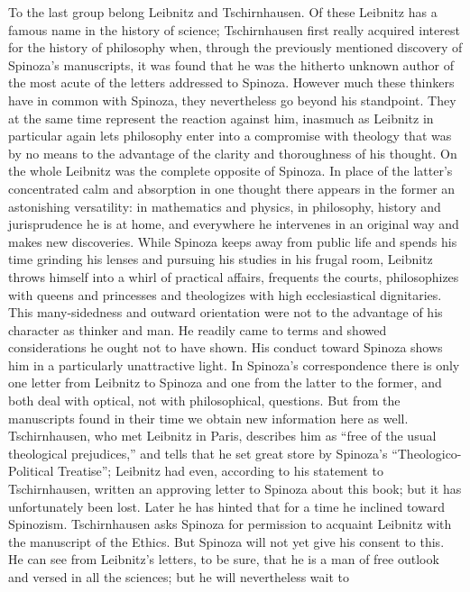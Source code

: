 \documentclass[12pt]{book}
\newcommand{\opage}[1]{\marginnote{\footnotesize\textit{[#1]}}}
\begin{document}
To the last group belong Leibnitz and Tschirnhausen. Of these Leibnitz has a famous
name in the history of science; Tschirnhausen first really acquired interest for the
history of philosophy when, through the previously mentioned discovery of Spinoza's
manuscripts, it was found that he was the hitherto unknown author of the most acute of
the letters addressed to Spinoza. However much these thinkers have in common with
Spinoza, they nevertheless go beyond his standpoint. They at the same time represent
the reaction against him, inasmuch as \opage{65}Leibnitz in particular again lets
philosophy enter into a compromise with theology that was by no means to the advantage
of the clarity and thoroughness of his thought. On the whole Leibnitz was the complete
opposite of Spinoza. In place of the latter's concentrated calm and absorption in one
thought there appears in the former an astonishing versatility: in mathematics and
physics, in philosophy, history and jurisprudence he is at home, and everywhere he
intervenes in an original way and makes new discoveries. While Spinoza keeps away from
public life and spends his time grinding his lenses and pursuing his studies in his
frugal room, Leibnitz throws himself into a whirl of practical affairs, frequents the
courts, philosophizes with queens and princesses and theologizes with high
ecclesiastical dignitaries. This many-sidedness and outward orientation were not to the
advantage of his character as thinker and man. He readily came to terms and showed
considerations he ought not to have shown. His conduct toward Spinoza shows him in a
particularly unattractive light. In Spinoza's correspondence there is only one letter
from Leibnitz to Spinoza and one from the latter to the former, and both deal with
optical, not with philosophical, questions. But from the manuscripts found in their
time we obtain new information here as well. Tschirnhausen, who met Leibnitz in Paris,
describes him as ``free of the usual theological prejudices,'' and tells that he set
great store by Spinoza's ``Theologico-Political Treatise''; Leibnitz had even,
according to his statement to Tschirnhausen, written an approving letter to Spinoza
about this book; but it has unfortunately been lost. Later he has hinted that for a
time he inclined toward Spinozism. Tschirnhausen \opage{66}asks Spinoza for permission
to acquaint Leibnitz with the manuscript of the Ethics. But Spinoza will not yet give
his consent to this. He can see from Leibnitz's letters, to be sure, that he is a man
of free outlook and versed in all the sciences; but he will nevertheless wait to
\end{document}
